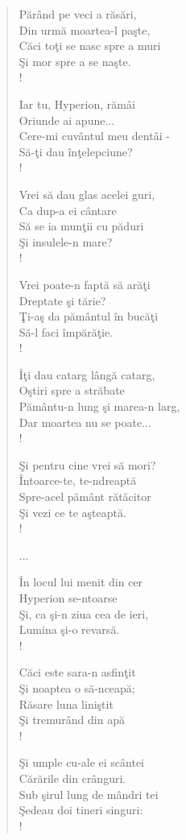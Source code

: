 \documentclass{article}
\begin{document}
\begin{small}
\begin{multicols}{3}
\begin{verse}
Părând pe veci a răsări, \\
Din urmă moartea-l paşte, \\
Căci toţi se nasc spre a muri \\
Şi mor spre a se naşte. \\!

Iar tu, Hyperion, rămâi \\
Oriunde ai apune... \\
Cere-mi cuvântul meu dentâi - \\
Să-ţi dau înţelepciune? \\!

Vrei să dau glas acelei guri, \\
Ca dup-a ei cântare \\
Să se ia munţii cu păduri \\
Şi insulele-n mare? \\!

Vrei poate-n faptă să arăţi \\
Dreptate şi tărie? \\
Ţi-aş da pământul în bucăţi \\
Să-l faci împărăţie. \\!

Îţi dau catarg lângă catarg, \\
Oştiri spre a străbate \\
Pământu-n lung şi marea-n larg, \\
Dar moartea nu se poate... \\!

Şi pentru cine vrei să mori? \\
Întoarce-te, te-ndreaptă \\
Spre-acel pământ rătăcitor \\
Şi vezi ce te aşteaptă. \\!

...

În locul lui menit din cer \\
Hyperion se-ntoarse \\
Şi, ca şi-n ziua cea de ieri, \\
Lumina şi-o revarsă. \\!

Căci este sara-n asfinţit \\
Şi noaptea o să-nceapă; \\
Răsare luna liniştit \\
Şi tremurând din apă \\!

Şi umple cu-ale ei scântei \\
Cărările din crânguri. \\
Sub şirul lung de mândri tei \\
Şedeau doi tineri singuri: \\!


\end{verse}
\end{multicols}
\end{small}
\end{document}
